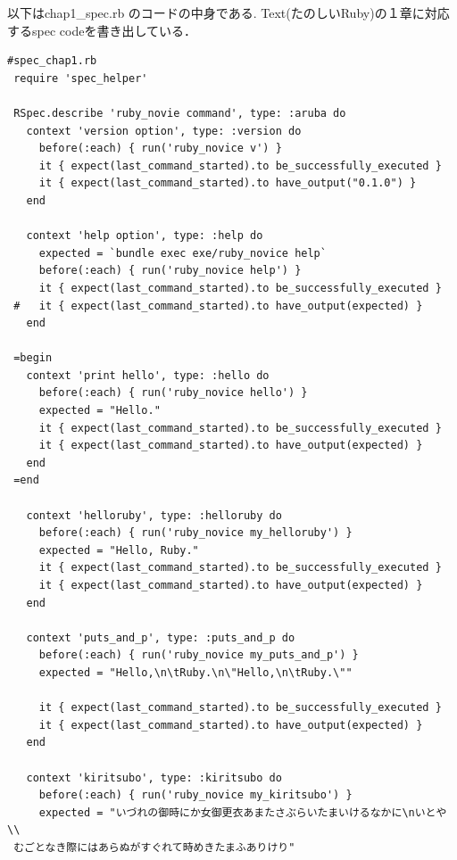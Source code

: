 以下はchap1\_spec.rb のコードの中身である. 
Text(たのしいRuby)の１章に対応するspec codeを書き出している．

\begin{lstlisting}[style=customRuby,basicstyle={\scriptsize\ttfamily}]
 #spec_chap1.rb
 require 'spec_helper'
 
 RSpec.describe 'ruby_novie command', type: :aruba do
   context 'version option', type: :version do
     before(:each) { run('ruby_novice v') }
     it { expect(last_command_started).to be_successfully_executed }
     it { expect(last_command_started).to have_output("0.1.0") }
   end
 
   context 'help option', type: :help do
     expected = `bundle exec exe/ruby_novice help`
     before(:each) { run('ruby_novice help') }
     it { expect(last_command_started).to be_successfully_executed }
 #   it { expect(last_command_started).to have_output(expected) }               
   end
 
 =begin                                                                          
   context 'print hello', type: :hello do                                        
     before(:each) { run('ruby_novice hello') }                                  
     expected = "Hello."                                                         
     it { expect(last_command_started).to be_successfully_executed }             
     it { expect(last_command_started).to have_output(expected) }    
   end                                                                           
 =end 
 
   context 'helloruby', type: :helloruby do
     before(:each) { run('ruby_novice my_helloruby') }
     expected = "Hello, Ruby."
     it { expect(last_command_started).to be_successfully_executed }
     it { expect(last_command_started).to have_output(expected) }
   end
 
   context 'puts_and_p', type: :puts_and_p do
     before(:each) { run('ruby_novice my_puts_and_p') }
     expected = "Hello,\n\tRuby.\n\"Hello,\n\tRuby.\""
 
     it { expect(last_command_started).to be_successfully_executed }
     it { expect(last_command_started).to have_output(expected) }
   end
 
   context 'kiritsubo', type: :kiritsubo do
     before(:each) { run('ruby_novice my_kiritsubo') }
     expected = "いづれの御時にか女御更衣あまたさぶらいたまいけるなかに\nいとや\\
 むごとなき際にはあらぬがすぐれて時めきたまふありけり"
 

\end{lstlisting}
